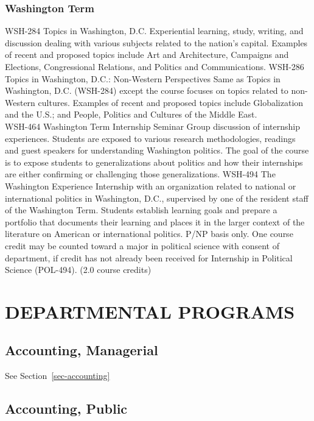 \documentclass[
  letterpaper,
]{scrbook}
\begin{document}
\subsection{Washington
Term}\label{sec-academic-programs-washington-term}

WSH-284 Topics in Washington, D.C. Experiential learning, study,
writing, and discussion dealing with various subjects related to the
nation's capital. Examples of recent and proposed topics include Art and
Architecture, Campaigns and Elections, Congressional Relations, and
Politics and Communications. WSH-286 Topics in Washington, D.C.:
Non-Western Perspectives Same as Topics in Washington, D.C. (WSH-284)
except the course focuses on topics related to non-Western cultures.
Examples of recent and proposed topics include Globalization and the
U.S.; and People, Politics and Cultures of the Middle East.\\
WSH-464 Washington Term Internship Seminar Group discussion of
internship experiences. Students are exposed to various research
methodologies, readings and guest speakers for understanding Washington
politics. The goal of the course is to expose students to
generalizations about politics and how their internships are either
confirming or challenging those generalizations. WSH-494 The Washington
Experience Internship with an organization related to national or
international politics in Washington, D.C., supervised by one of the
resident staff of the Washington Term. Students establish learning goals
and prepare a portfolio that documents their learning and places it in
the larger context of the literature on American or international
politics. P/NP basis only. One course credit may be counted toward a
major in political science with consent of department, if credit has not
already been received for Internship in Political Science (POL-494).
(2.0 course credits)

\chapter{DEPARTMENTAL PROGRAMS}\label{departmental-programs}

\section{Accounting, Managerial}\label{accounting-managerial}

See Section~\ref{sec-accounting}

\section{Accounting, Public}\label{accounting-public}
\end{document}
